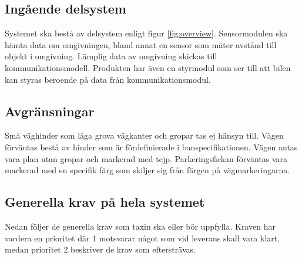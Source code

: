 \documentclass[kravspec/krav.tex]{subfiles}
\begin{document}
\subsection{Ingående delsystem}
Systemet ska bestå av delsystem enligt figur \ref{fig:overview}. Sensormodulen
ska hämta data om omgivningen, bland annat en sensor som mäter avstånd till
objekt i omgivning. Lämplig data av omgivning skickas till
kommunikationsmodell. Produkten har även en styrmodul som ser till att bilen
kan styras beroende på data från kommunikationsmodul.

\subsection{Avgränsningar}
Små väghinder som låga grova vägkanter och gropar tas ej hänsyn till. Vägen
förväntas bestå av hinder som är fördefinierade i banspecifikationen. Vägen
antas vara plan utan gropar och markerad med tejp. Parkeringsfickan förväntas
vara markerad med en specifik färg som skiljer sig från färgen på
vägmarkeringarna.

\subsection{Generella krav på hela systemet}
Nedan följer de generella krav som taxin ska eller bör uppfylla. Kraven har
vardera en prioritet där 1 motsvarar något som vid leverans skall vara klart, medan prioritet 2 beskriver de krav som eftersträvas.
\end{document}
